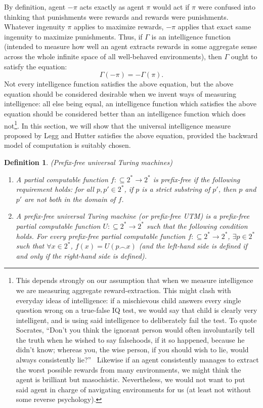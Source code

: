 \documentclass{article}
\newtheorem{definition}[theorem]{Definition}
\begin{document}
By definition, agent $-\pi$ acts exactly as agent $\pi$ would
act if $\pi$ were confused into thinking that punishments were rewards
and rewards were punishments.
Whatever ingenuity $\pi$ applies to maximize rewards,
$-\pi$ applies that exact same ingenuity to maximize punishments.
Thus, if $\Gamma$ is an intelligence function (intended to measure how
well an agent extracts rewards in some aggregate sense across the whole
infinite space of all well-behaved environments), then $\Gamma$ ought
to satisfy the equation:
\[
    \Gamma(-\pi) = -\Gamma(\pi).
\]
Not every intelligence function satisfies the above equation, but the
above equation should be considered desirable when we
invent ways of measuring intelligence: all else being equal, an
intelligence function which satisfies the above equation should be
considered better than an intelligence function which does
not\footnote{This depends strongly on our assumption that when we
measure intelligence we are measuring aggregate reward-extraction. This might clash
with everyday ideas of intelligence: if a mischievous child answers every single
question wrong on a true-false IQ test, we would say that child is clearly very
intelligent, and is using said intelligence to deliberately fail the test.
To quote Socrates, ``Don't you think the ignorant person would often involuntarily
tell the truth when he wished to say falsehoods, if it so happened, because he
didn't know; whereas you, the wise person, if you should wish to lie,
would always consistently lie?''\ \cite{lesserhippias}
Likewise if an agent consistently manages to extract the worst possible rewards
from many environments, we might think the agent is brilliant but
masochistic.
Nevertheless, we would not want to put said agent
in charge of navigating environments for us (at least not without some
reverse psychology).}.
In this section, we will show that the universal intelligence measure
proposed by Legg and Hutter satisfies the above equation, provided the
backward model of computation is suitably chosen.

\begin{definition}
    (Prefix-free universal Turing machines)
    \begin{enumerate}
        \item A partial computable function $f:\subseteq 2^*\to 2^*$
        is \emph{prefix-free} if the following requirement holds:
        for all $p,p'\in 2^*$, if $p$ is a strict substring of $p'$,
        then $p$ and $p'$ are not both in the domain of $f$.
        \item A \emph{prefix-free universal Turing machine}
        (or \emph{prefix-free UTM}) is a prefix-free
        partial computable function $U:\subseteq 2^*\to 2^*$
        such that the following condition holds.
        For every prefix-free partial computable function
        $f:\subseteq 2^*\to 2^*$, $\exists p\in 2^*$ such that
        $\forall x\in 2^*$, $f(x)=U(p\frown x)$ (and the left-hand side is
        defined if and only if the right-hand side is defined).
    \end{enumerate}
\end{definition}
\end{document}
